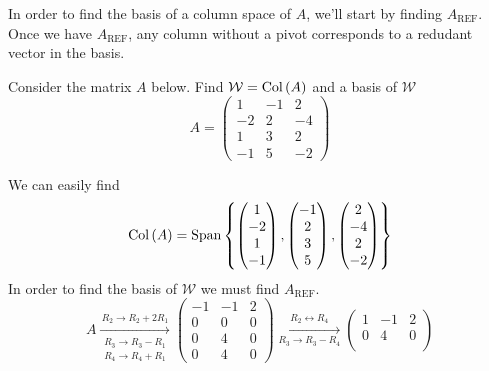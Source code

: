 In order to find the basis of a column space of $A$, we'll start by finding $A_{\text{REF}}$. Once we have $A_{\text{REF}}$, any column without a pivot corresponds to a redudant vector in the basis.
\begin{example}{}{}
    Consider the matrix $A$ below. Find $\mathcal{W} = \text{Col}\left(A\right)$ and a basis of $\mathcal{W}$
    \[
        A = \begin{pmatrix}
            1 & -1 & 2 \\
            -2 & 2 & -4 \\
            1 & 3 & 2 \\
            -1 & 5 & -2
        \end{pmatrix} 
    \]
    \begin{solution}
        We can easily find 
        \[
            \text{Col}\left(A\right) = \text{Span}\left\{
                \begin{pmatrix}
                    1 \\ -2 \\ 1 \\ -1
                \end{pmatrix},
                \begin{pmatrix}
                    -1 \\ 2 \\ 3 \\ 5
                \end{pmatrix},
                \begin{pmatrix}
                    2 \\ -4 \\ 2 \\ -2
                \end{pmatrix}
             \right\} 
        \]
        In order to find the basis of $\mathcal{W}$ we must find $A_{\text{REF}}$.
        \[
            A \xrightarrow[\substack{R_3 \to R_3 - R_1 \\ R_4 \to R_4 + R_1}]{R_2 \to R_2 + 2R_1} 
            \begin{pmatrix}
                -1 & -1 & 2 \\
                0 & 0 & 0 \\
                0 & 4 & 0 \\
                0 & 4 & 0     
            \end{pmatrix}
            \xrightarrow[R_3 \to R_3 - R_4]{R_2 \leftrightarrow R_4} 
            \begin{pmatrix}
                1 & -1 & 2 \\
                0 & 4 & 0 \\

\end{pmatrix}\]
\end{solution}
\end{example}
